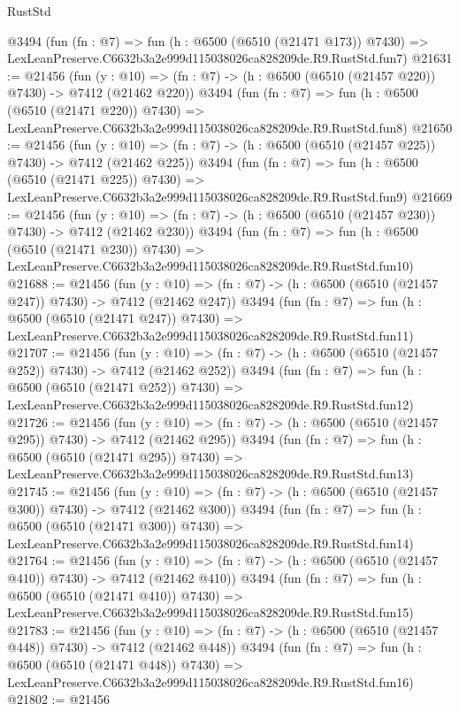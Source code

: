 \begin{lexlean}{RustStd}
\begin{coremodule}
    @3494
    (fun (fn : @7) =>
    fun (h : @6500 (@6510 (@21471 @173)) @7430) =>
    LexLeanPreserve.C6632b3a2e999d115038026ca828209de.R9.RustStd.fun7)
@21631 := @21456
    (fun (y : @10) => (fn : @7) -> (h : @6500 (@6510 (@21457 @220)) @7430) -> @7412 (@21462 @220))
    @3494
    (fun (fn : @7) =>
    fun (h : @6500 (@6510 (@21471 @220)) @7430) =>
    LexLeanPreserve.C6632b3a2e999d115038026ca828209de.R9.RustStd.fun8)
@21650 := @21456
    (fun (y : @10) => (fn : @7) -> (h : @6500 (@6510 (@21457 @225)) @7430) -> @7412 (@21462 @225))
    @3494
    (fun (fn : @7) =>
    fun (h : @6500 (@6510 (@21471 @225)) @7430) =>
    LexLeanPreserve.C6632b3a2e999d115038026ca828209de.R9.RustStd.fun9)
@21669 := @21456
    (fun (y : @10) => (fn : @7) -> (h : @6500 (@6510 (@21457 @230)) @7430) -> @7412 (@21462 @230))
    @3494
    (fun (fn : @7) =>
    fun (h : @6500 (@6510 (@21471 @230)) @7430) =>
    LexLeanPreserve.C6632b3a2e999d115038026ca828209de.R9.RustStd.fun10)
@21688 := @21456
    (fun (y : @10) => (fn : @7) -> (h : @6500 (@6510 (@21457 @247)) @7430) -> @7412 (@21462 @247))
    @3494
    (fun (fn : @7) =>
    fun (h : @6500 (@6510 (@21471 @247)) @7430) =>
    LexLeanPreserve.C6632b3a2e999d115038026ca828209de.R9.RustStd.fun11)
@21707 := @21456
    (fun (y : @10) => (fn : @7) -> (h : @6500 (@6510 (@21457 @252)) @7430) -> @7412 (@21462 @252))
    @3494
    (fun (fn : @7) =>
    fun (h : @6500 (@6510 (@21471 @252)) @7430) =>
    LexLeanPreserve.C6632b3a2e999d115038026ca828209de.R9.RustStd.fun12)
@21726 := @21456
    (fun (y : @10) => (fn : @7) -> (h : @6500 (@6510 (@21457 @295)) @7430) -> @7412 (@21462 @295))
    @3494
    (fun (fn : @7) =>
    fun (h : @6500 (@6510 (@21471 @295)) @7430) =>
    LexLeanPreserve.C6632b3a2e999d115038026ca828209de.R9.RustStd.fun13)
@21745 := @21456
    (fun (y : @10) => (fn : @7) -> (h : @6500 (@6510 (@21457 @300)) @7430) -> @7412 (@21462 @300))
    @3494
    (fun (fn : @7) =>
    fun (h : @6500 (@6510 (@21471 @300)) @7430) =>
    LexLeanPreserve.C6632b3a2e999d115038026ca828209de.R9.RustStd.fun14)
@21764 := @21456
    (fun (y : @10) => (fn : @7) -> (h : @6500 (@6510 (@21457 @410)) @7430) -> @7412 (@21462 @410))
    @3494
    (fun (fn : @7) =>
    fun (h : @6500 (@6510 (@21471 @410)) @7430) =>
    LexLeanPreserve.C6632b3a2e999d115038026ca828209de.R9.RustStd.fun15)
@21783 := @21456
    (fun (y : @10) => (fn : @7) -> (h : @6500 (@6510 (@21457 @448)) @7430) -> @7412 (@21462 @448))
    @3494
    (fun (fn : @7) =>
    fun (h : @6500 (@6510 (@21471 @448)) @7430) =>
    LexLeanPreserve.C6632b3a2e999d115038026ca828209de.R9.RustStd.fun16)
@21802 := @21456

\end{coremodule}
\end{lexlean}
